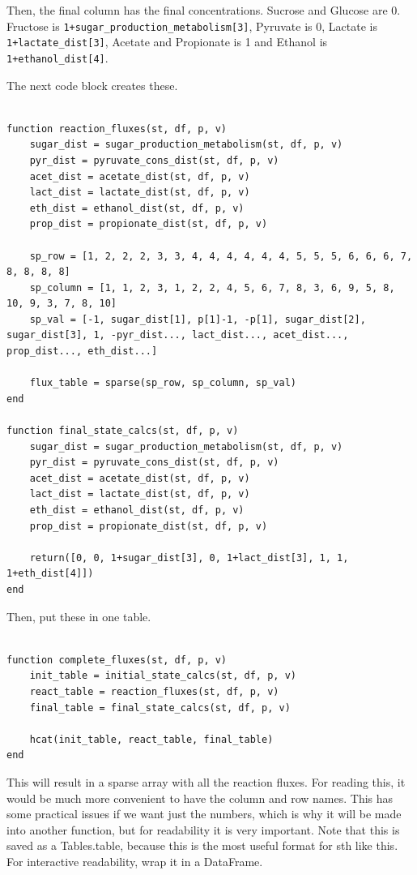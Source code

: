 \documentclass[11pt]{article}
\begin{document}
Then, the final column has the final concentrations. Sucrose and Glucose are 0. Fructose is \texttt{1+sugar\_production\_metabolism[3]}, Pyruvate is 0, Lactate is \texttt{1+lactate\_dist[3]}, Acetate and Propionate is 1 and Ethanol is \texttt{1+ethanol\_dist[4]}.

The next code block creates these.

\begin{verbatim}

function reaction_fluxes(st, df, p, v)
    sugar_dist = sugar_production_metabolism(st, df, p, v)
    pyr_dist = pyruvate_cons_dist(st, df, p, v)
    acet_dist = acetate_dist(st, df, p, v)
    lact_dist = lactate_dist(st, df, p, v)
    eth_dist = ethanol_dist(st, df, p, v)
    prop_dist = propionate_dist(st, df, p, v)

    sp_row = [1, 2, 2, 2, 3, 3, 4, 4, 4, 4, 4, 4, 5, 5, 5, 6, 6, 6, 7, 8, 8, 8, 8]
    sp_column = [1, 1, 2, 3, 1, 2, 2, 4, 5, 6, 7, 8, 3, 6, 9, 5, 8, 10, 9, 3, 7, 8, 10]
    sp_val = [-1, sugar_dist[1], p[1]-1, -p[1], sugar_dist[2], sugar_dist[3], 1, -pyr_dist..., lact_dist..., acet_dist..., prop_dist..., eth_dist...]

    flux_table = sparse(sp_row, sp_column, sp_val)
end

function final_state_calcs(st, df, p, v)
    sugar_dist = sugar_production_metabolism(st, df, p, v)
    pyr_dist = pyruvate_cons_dist(st, df, p, v)
    acet_dist = acetate_dist(st, df, p, v)
    lact_dist = lactate_dist(st, df, p, v)
    eth_dist = ethanol_dist(st, df, p, v)
    prop_dist = propionate_dist(st, df, p, v)

    return([0, 0, 1+sugar_dist[3], 0, 1+lact_dist[3], 1, 1, 1+eth_dist[4]])
end
\end{verbatim}

Then, put these in one table.

\begin{verbatim}

function complete_fluxes(st, df, p, v)
    init_table = initial_state_calcs(st, df, p, v)
    react_table = reaction_fluxes(st, df, p, v)
    final_table = final_state_calcs(st, df, p, v)

    hcat(init_table, react_table, final_table)
end

\end{verbatim}

This will result in a sparse array with all the reaction fluxes. For reading this, it would be much more convenient to have the column and row names. This has some practical issues if we want just the numbers, which is why it will be made into another function, but for readability it is very important. Note that this is saved as a Tables.table, because this is the most useful format for sth like this. For interactive readability, wrap it in a DataFrame.
\end{document}

